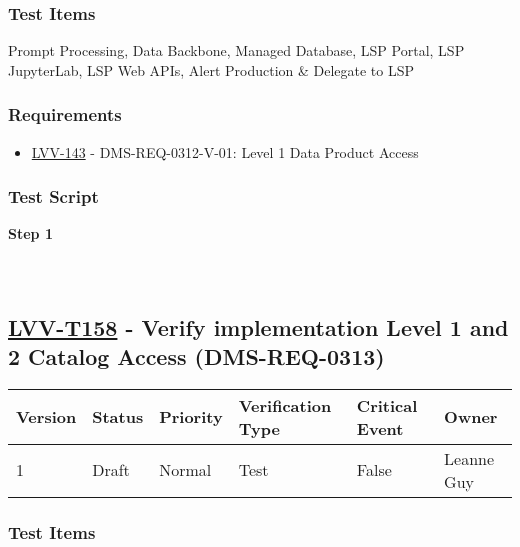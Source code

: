 \hypertarget{test-items-57}{%
\subsubsection{Test Items}\label{test-items-57}}

Prompt Processing, Data Backbone, Managed Database, LSP Portal, LSP
JupyterLab, LSP Web APIs, Alert Production \& Delegate to LSP

\hypertarget{requirements-57}{%
\subsubsection{Requirements}\label{requirements-57}}

\begin{itemize}
\tightlist
\item
  \href{https://jira.lsstcorp.org/browse/LVV-143}{LVV-143} -
  DMS-REQ-0312-V-01: Level 1 Data Product Access
\end{itemize}

\hypertarget{test-script-57}{%
\subsubsection{Test Script}\label{test-script-57}}

\textbf{Step 1}\\
~\\
~\\

\hypertarget{lvv-t158---verify-implementation-level-1-and-2-catalog-access-dms-req-0313}{%
\subsection{\texorpdfstring{\href{https://jira.lsstcorp.org/secure/Tests.jspa\#/testCase/LVV-T158}{LVV-T158}
- Verify implementation Level 1 and 2 Catalog Access
(DMS-REQ-0313)}{LVV-T158 - Verify implementation Level 1 and 2 Catalog Access (DMS-REQ-0313)}}\label{lvv-t158---verify-implementation-level-1-and-2-catalog-access-dms-req-0313}}

\begin{longtable}[]{@{}llllll@{}}
\toprule
Version & Status & Priority & Verification Type & Critical Event &
Owner\tabularnewline
\midrule
\endhead
1 & Draft & Normal & Test & False & Leanne Guy\tabularnewline
\bottomrule
\end{longtable}

\hypertarget{test-items-58}{%
\subsubsection{Test Items}\label{test-items-58}}

